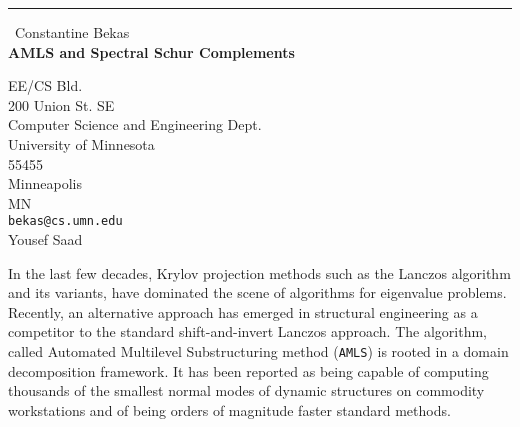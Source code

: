 \documentclass{report}
\begin{document}
\begin{center}
\rule{6in}{1pt} \
{\large Constantine Bekas \\
{\bf AMLS and Spectral Schur Complements}}

EE/CS Bld. \\ 200 Union St. SE \\ Computer Science and Engineering Dept. \\ University of Minnesota \\ 55455 \\ Minneapolis \\ MN
\\
{\tt bekas@cs.umn.edu}\\
Yousef Saad\end{center}

In the last few decades, Krylov projection methods such as the Lanczos
algorithm and its variants, have dominated the scene of algorithms for
eigenvalue problems. Recently, an alternative approach has emerged in
structural engineering as a competitor to the standard shift-and-invert
Lanczos approach. The algorithm, called Automated Multilevel
Substructuring method ({\tt AMLS}) is rooted in a domain
decomposition framework. It has been reported as being capable of
computing thousands of the smallest normal modes of dynamic structures on
commodity workstations and of being orders of magnitude faster standard
methods.
\end{document}
